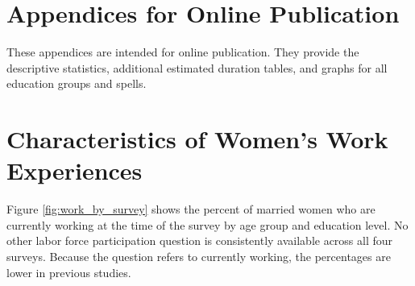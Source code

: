 \documentclass[12pt,letterpaper]{article}
\begin{document}



\clearpage
\newpage

\appendix

\renewcommand\thefigure{\thesection.\arabic{figure}}    
\renewcommand\thetable{\thesection.\arabic{table}}    

\section*{Appendices for Online Publication}

These appendices are intended for online publication.
They provide the descriptive statistics, additional
estimated duration tables, and graphs for all 
education groups and spells.

\clearpage
\newpage

\section{Characteristics of Women's Work Experiences}

\setcounter{figure}{0}
\setcounter{table}{0}

Figure \ref{fig:work_by_survey} shows the percent of married women who are 
currently working at the time of the survey by age group and education level.
No other labor force participation question is consistently available across all 
four surveys. 
Because the question refers to currently working, the percentages are lower in previous
studies. 
\end{document}
